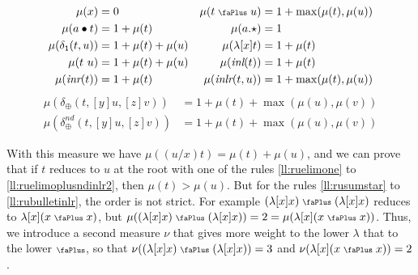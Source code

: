 \documentclass[screen, sigconf,authorversion,nonacm]{acmart}
\theoremstyle{acmdefinition}
\numberwithin{equation}{section}
\newcommand\abstr[1]{[#1]}
\newcommand\inl{\mbox{\it inl}}
\newcommand\inr{\mbox{\it inr}}
\newcommand\inlr{\mbox{\it inlr}}
\newcommand\plus{\mathrel{\text{\normalfont\scalebox{0.7}{\faPlus}}}}
\newcommand\one{\ensuremath{\mathtt 1}}
\newcommand\elimone{\delta_{\one}}
\newcommand\elimplus{\delta_{\oplus}}
\begin{document}
\begin{definition}
\label{measureofaproof}~
    \begin{align*}
      \mu(x) &= 0 & \mu(t \plus u) &= 1 + \max(\mu(t), \mu(u)) \\
      \mu(a \bullet t) &= 1 + \mu(t) & \mu(a.\star) &= 1\\
      \mu(\elimone(t,u)) &= 1 + \mu(t) + \mu(u) &
      \mu(\lambda \abstr{x} t) &= 1 + \mu(t) \\
      \mu(t~u) &= 1 + \mu(t) + \mu(u) & \mu(\inl(t)) &= 1 + \mu(t)\\
      \mu(\inr(t)) &= 1 + \mu(t) & \mu(\inlr(t,u)) &= 1 + \max(\mu(t), \mu(u))\\
    \end{align*}
    \vspace{-1cm}
    \begin{align*}
      \mu(\elimplus(t,\abstr{y} u,\abstr{z} v)) &= 1 + \mu(t) + \max(\mu(u), \mu(v))\\
      \mu(\elimplus^{nd}(t,\abstr{y} u,\abstr{z} v)) &= 1 + \mu(t) + \max(\mu(u), \mu(v)) 
    \end{align*}
\end{definition}

With this measure we have $\mu((u/x)t) = \mu(t)+\mu(u)$, and we can
prove that if $t$ reduces to $u$ at the root with one of the rules
\eqref{ll:ruelimone} to \eqref{ll:ruelimoplusndinlr2}, then $\mu(t) >
\mu(u)$. But for the rules \eqref{ll:rusumstar} to
\eqref{ll:rubulletinlr}, the order is not strict. For example
$(\lambda \abstr{x}x) \plus (\lambda \abstr{x}x)$ reduces to $\lambda
\abstr{x}(x \plus x)$, but $\mu((\lambda \abstr{x}x) \plus (\lambda
\abstr{x}x)) = 2 = \mu(\lambda \abstr{x}(x \plus x))$.  Thus, we
introduce a second measure $\nu$ that gives more weight to the lower
$\lambda$ that to the lower $\plus$, so that $\nu((\lambda \abstr{x}x)
\plus (\lambda \abstr{x}x)) = 3$ and $\nu(\lambda \abstr{x}(x \plus
x)) = 2$.
\end{document}
